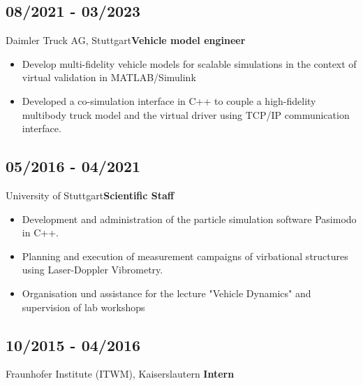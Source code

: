 \documentclass{classic}
\begin{document}
\begin{paracol}{2}
{    \subsection{08/2021 - 03/2023}{Daimler Truck AG, Stuttgart}{\bfseries Vehicle model engineer}
          \begin{itemize}
              \item Develop multi-fidelity vehicle models for scalable simulations in the context of
          virtual validation in MATLAB/Simulink
            \item Developed a co-simulation interface in C++ to couple a high-fidelity
                multibody truck model and the virtual driver using
                TCP/IP communication interface.
          \end{itemize}

    \subsection{05/2016 - 04/2021}{University of Stuttgart}{{\bfseries Scientific Staff}}
           \begin{itemize}
               \item Development and administration of the particle simulation
                   software Pasimodo in C++.
               \item Planning and execution of measurement campaigns of
                   virbational structures using Laser-Doppler Vibrometry.
               \item Organisation und assistance for the lecture "Vehicle
                   Dynamics" and supervision of lab workshops
           \end{itemize}

    \subsection{10/2015 - 04/2016}{Fraunhofer Institute (ITWM), Kaiserslautern}
        {{\bfseries Intern}}\\
}
\end{paracol}
\end{document}
